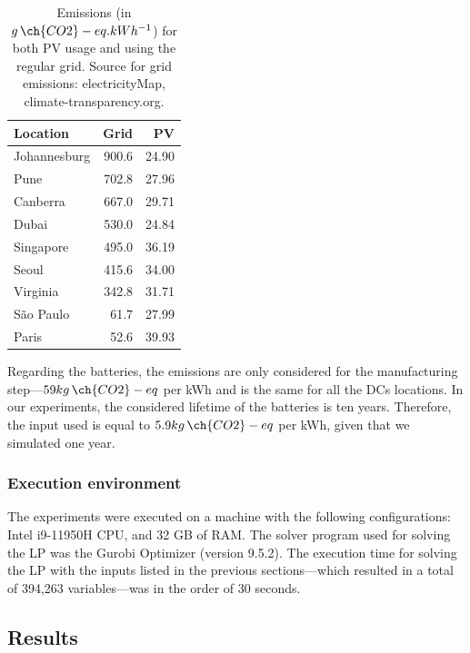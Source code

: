 \begin{table}

  \caption{Emissions (in $g\,\ch{CO2}-eq.kWh^{-1}$) for both PV usage and using the regular grid. Source for grid emissions: electricityMap, climate-transparency.org.}\label{tab:carbonfootprint} \centering
  \begin{tabular}{|l|r|r|}
    
  \hline
    
  \textbf{Location} &  \textbf{Grid} & \textbf{PV} \\
  \hline
  Johannesburg & 900.6 & 24.90 \\
  \hline
  Pune & 702.8 & 27.96 \\
  \hline
  Canberra & 667.0 & 29.71 \\
  \hline
  Dubai & 530.0  & 24.84 \\
  \hline
  Singapore & 495.0 & 36.19 \\
  \hline     
  Seoul & 415.6 & 34.00 \\
  \hline
  Virginia  & 342.8 & 31.71 \\
  \hline
  São Paulo &  61.7 & 27.99\\
  \hline 
  Paris &  52.6  & 39.93 \\
  \hline  

\end{tabular}  
\end{table}

Regarding the batteries, the emissions are only considered for the manufacturing step---$59 kg\,\ch{CO2}-eq$ per kWh and is the same for all the DCs locations. In our experiments, the considered lifetime of the batteries is ten years. Therefore, the input used is equal to $5.9 kg\,\ch{CO2}-eq$ per kWh, given that we simulated one year.

\subsubsection{Execution environment}
 
The experiments were executed on a machine with the following configurations: Intel i9-11950H CPU, and 32 GB of RAM. The solver program used for solving the LP was the Gurobi Optimizer (version 9.5.2). The execution time for solving the LP with the inputs listed in the previous sections---which resulted in a total of 394,263 variables---was in the order of 30 seconds.

\subsection{Results}

